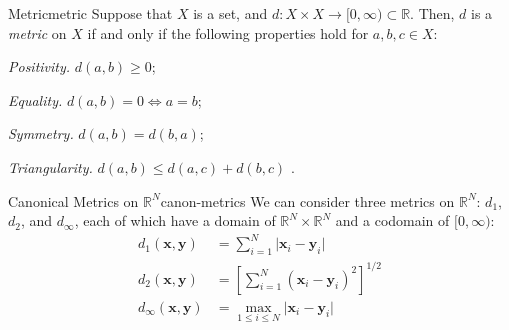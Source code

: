 \documentclass{article}
\renewcommand*\vec{\mathbf}
\numberwithin{equation}{section}
\numberwithin{enumi}{section}
\newcommand*\setaxiomprefix[1]{
    \setlist[axioms]{label=#1\arabic*), ref=#1\arabic*}
}
\begin{document}
\begin{definition}{Metric}{metric}
    Suppose that $ X $ is a set, and $ d \colon X \times X \to [0, \infty)
    \subset \mathbb{R} $. Then, $ d $ is a \emph{metric} on $ X $ if and only if
    the following properties hold for $ a, b, c \in X $:
    \setaxiomprefix{M}
    \begin{axioms}
        \item \emph{Positivity.} $ d(a, b) \geq 0 $;
        \item \emph{Equality.} $ d(a, b) = 0 \iff a = b $;
        \item \emph{Symmetry.} $ d(a, b) = d(b, a) $;
        \item \emph{Triangularity.} $ d(a, b) \leq d(a, c) + d(b, c) $
            \label{itm:triangle-inequality}.
    \end{axioms}
\end{definition}
\begin{definition}{Canonical Metrics on \texorpdfstring{$\mathbb{R}^N$}{an
        N-dimensional real vector space}}{canon-metrics}
    We can consider three metrics on $ \mathbb{R}^N $: $ d_1 $, $ d_2 $, and
    $ d_\infty $, each of which have a domain of $ \mathbb{R}^N \times
    \mathbb{R}^N $ and a codomain of $ [0, \infty) $:
    \begin{align}
        d_1(\vec{x}, \vec{y}) &= \sum_{i=1}^N \vert \vec{x}_i - \vec{y}_i
            \vert \\
        d_2(\vec{x}, \vec{y}) &= \left[\sum_{i=1}^N (\vec{x}_i - \vec{y}_i)^2
            \right]^{1/2} \label{eqn:d2-metric} \\[.8em]
        d_\infty(\vec{x}, \vec{y}) &= \max_{1 \leq i \leq N} \vert \vec{x}_i -
            \vec{y}_i \vert
    \end{align}
\end{definition}
\end{document}
